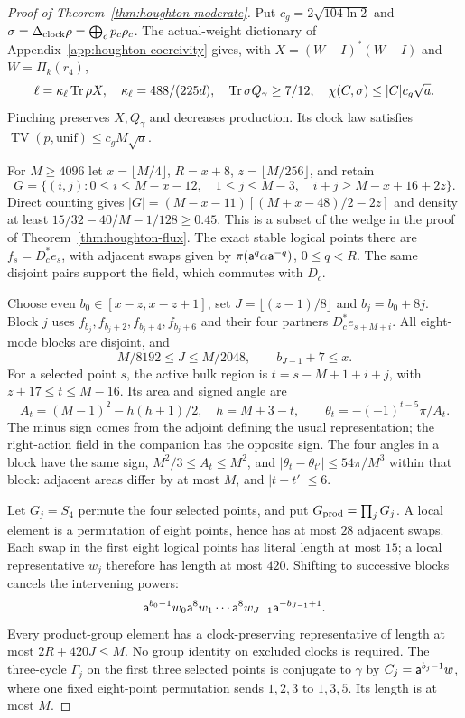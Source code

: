 \begin{proof}[Proof of Theorem~\ref{thm:houghton-moderate}]
Put $c_g=2\sqrt{104\ln2}$ and
$\sigma=\Delta_{\rm clock}\rho=\bigoplus_cp_c\rho_c$.
The actual-weight dictionary of Appendix~\ref{app:houghton-coercivity}
gives, with $X=(W-I)^*(W-I)$ and $W=\Pi_k(r_4)$,
\[
 \ell=\kappa_\ell\operatorname{Tr}\rho X,\quad \kappa_\ell=488/(225d),\quad
 \operatorname{Tr}\sigma Q_\gamma\geq7/12,\quad
 \chi(C,\sigma)\leq |C|c_g\sqrt a.
\]
Pinching preserves $X,Q_\gamma$ and decreases production. Its clock
law satisfies $\operatorname{TV}(p,\mathrm{unif})\leq c_gM\sqrt a$.

For $M\geq4096$ let $x=\lfloor M/4\rfloor$, $R=x+8$,
$z=\lfloor M/256\rfloor$, and retain
\[
 G=\{(i,j):0\leq i\leq M-x-12,\quad1\leq j\leq M-3,
                 \quad i+j\geq M-x+16+2z\}.
\]
Direct counting gives
$|G|=(M-x-11)[(M+x-48)/2-2z]$ and density at least
$15/32-40/M-1/128\geq0.45$.
This is a subset of the wedge in the proof of
Theorem~\ref{thm:houghton-flux}. The exact stable logical points there
are $f_s=D_c^*e_s$, with adjacent swaps given by
$\pi(\mathsf a^q\alpha\mathsf a^{-q})$, $0\leq q<R$.
The same disjoint pairs support the field, which commutes with $D_c$.

Choose even $b_0\in[x-z,x-z+1]$, set
$J=\lfloor(z-1)/8\rfloor$ and $b_j=b_0+8j$.
Block $j$ uses $f_{b_j},f_{b_j+2},f_{b_j+4},f_{b_j+6}$
and their four partners $D_c^*e_{s+M+i}$.
All eight-mode blocks are disjoint, and
\[
 M/8192\leq J\leq M/2048,\qquad b_{J-1}+7\leq x.
\]
For a selected point $s$, the active bulk region is
$t=s-M+1+i+j$, with $z+17\leq t\leq M-16$.
Its area and signed angle are
\[
 A_t=(M-1)^2-h(h+1)/2,\quad h=M+3-t,
 \qquad\theta_t=-(-1)^{t-5}\pi/A_t.
\]
The minus sign comes from the adjoint defining the usual representation;
the right-action field in the companion has the opposite sign.
The four angles in a block have the same sign,
$M^2/3\leq A_t\leq M^2$, and
$|\theta_t-\theta_{t'}|\leq54\pi/M^3$ within that block:
adjacent areas differ by at most $M$, and $|t-t'|\leq6$.

Let $G_j=S_4$ permute the four selected points, and put
$G_{\rm prod}=\prod_jG_j$. A local element is a permutation of
eight points, hence has at most $28$ adjacent swaps. Each swap in
the first eight logical points has literal length at most $15$;
a local representative $w_j$ therefore has length at most $420$.
Shifting to successive blocks cancels the intervening powers:
\[
 \mathsf a^{b_0-1}w_0\mathsf a^8w_1\cdots
       \mathsf a^8w_{J-1}\mathsf a^{-b_{J-1}+1}.
\]
Every product-group element has a clock-preserving representative
of length at most ${2R+420J}\leq M$. No group identity on excluded
clocks is required.
The three-cycle $\Gamma_j$ on the first three selected points is
conjugate to $\gamma$ by $C_j=\mathsf a^{b_j-1}w$, where one fixed
eight-point permutation sends $1,2,3$ to $1,3,5$.
Its length is at most $M$.


\end{proof}
